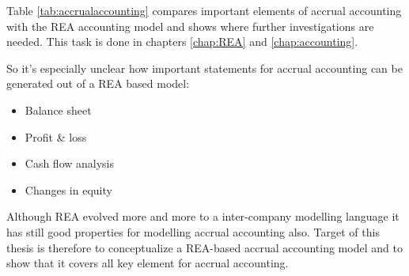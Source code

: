 Table \ref{tab:accrualaccounting} compares important elements of accrual accounting with the REA accounting model and shows where further investigations are needed.
This task is done in chapters \ref{chap:REA} and \ref{chap:accounting}.

So it's especially unclear how important statements for accrual accounting can be generated out of a REA based model:
\begin{itemize}[noitemsep]%
	\item Balance sheet
	\item Profit \& loss
	\item Cash flow analysis
	\item Changes in equity
\end{itemize}
Although REA evolved more and more to a inter-company modelling language it has still good properties for modelling accrual accounting also.
Target of this thesis is therefore to conceptualize a REA-based accrual accounting model and to show that it covers all key element for accrual accounting.

